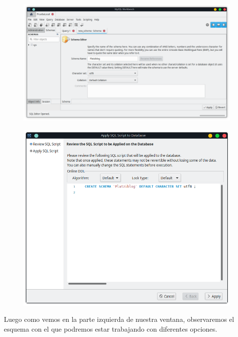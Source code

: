 \documentclass{article}
\begin{document}
\begin{figure}[h!]
  \centering
  \includegraphics[scale=0.55]{./Pictures/039_create_schema.png}
\end{figure}

\newpage

\begin{figure}[h!]
  \centering
  \includegraphics[scale=0.65]{./Pictures/040_create_schema.png}
\end{figure}

\newpage

Luego como vemos en la parte izquierda de nuestra ventana, observaremos el
esquema con el que podremos estar trabajando con diferentes opciones.
\end{document}

